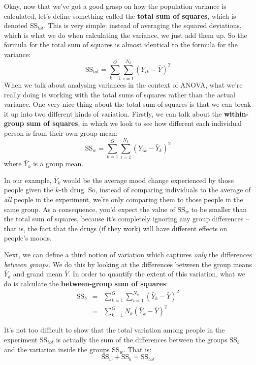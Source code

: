 \documentclass[
]{book}
\theoremstyle{definition}
\theoremstyle{definition}
\theoremstyle{definition}
\theoremstyle{definition}
\theoremstyle{remark}
\begin{document}
Okay, now that we've got a good grasp on how the population variance is calculated, let's define something called the \textbf{total sum of squares}, which is denoted \(\mbox{SS}_{tot}\). This is very simple: instead of averaging the squared deviations, which is what we do when calculating the variance, we just add them up. So the formula for the total sum of squares is almost identical to the formula for the variance:
\[
\mbox{SS}_{tot} = \sum_{k=1}^G \sum_{i=1}^{N_k} \left(Y_{ik} - \bar{Y} \right)^2
\]
When we talk about analysing variances in the context of ANOVA, what we're really doing is working with the total sums of squares rather than the actual variance. One very nice thing about the total sum of squares is that we can break it up into two different kinds of variation. Firstly, we can talk about the \textbf{within-group sum of squares}, in which we look to see how different each individual person is from their own group mean:
\[
\mbox{SS}_w = \sum_{k=1}^G \sum_{i=1}^{N_k} \left( Y_{ik} - \bar{Y}_k \right)^2
\]
where \(\bar{Y}_k\) is a group mean.

In our example, \(\bar{Y}_k\) would be the average mood change experienced by those people given the \(k\)-th drug. So, instead of comparing individuals to the average of \emph{all} people in the experiment, we're only comparing them to those people in the same group. As a consequence, you'd expect the value of \(\mbox{SS}_w\) to be smaller than the total sum of squares, because it's completely ignoring any group differences -- that is, the fact that the drugs (if they work) will have different effects on people's moods.

Next, we can define a third notion of variation which captures \emph{only} the differences \emph{between groups}. We do this by looking at the differences between the group means \(\bar{Y}_k\) and grand mean \(\bar{Y}\). In order to quantify the extent of this variation, what we do is calculate the \textbf{between-group sum of squares}:
\[
\begin{array}{rcl}
\mbox{SS}_{b} &=& \sum_{k=1}^G \sum_{i=1}^{N_k} \left( \bar{Y}_k - \bar{Y} \right)^2
 \\
&=& \sum_{k=1}^G N_k \left( \bar{Y}_k - \bar{Y} \right)^2
\end{array}
\]

It's not too difficult to show that the total variation among people in the experiment \(\mbox{SS}_{tot}\) is actually the sum of the differences between the groups \(\mbox{SS}_b\) and the variation inside the groups \(\mbox{SS}_w\). That is:
\[
\mbox{SS}_w  + \mbox{SS}_{b} = \mbox{SS}_{tot}
\]
\end{document}
